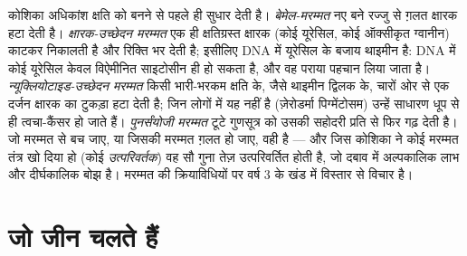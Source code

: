 \begin{proposition}\label{prop:b2:genome-diversification:repair}
कोशिका अधिकांश क्षति को  बनने से पहले ही सुधार देती है।
\emph{बेमेल-मरम्मत} नए बने रज्जु से ग़लत क्षारक हटा देती है।
\emph{क्षारक-उच्छेदन मरम्मत} एक ही क्षतिग्रस्त क्षारक (कोई यूरेसिल, कोई
ऑक्सीकृत ग्वानीन) काटकर निकालती है और रिक्ति भर देती है; इसीलिए DNA में
यूरेसिल के बजाय थाइमीन है: DNA में कोई यूरेसिल केवल विऐमीनित साइटोसीन ही
हो सकता है, और वह पराया पहचान लिया जाता है। \emph{न्यूक्लियोटाइड-उच्छेदन
मरम्मत} किसी भारी-भरकम क्षति के, जैसे थाइमीन द्विलक के, चारों ओर से एक
दर्जन क्षारक का टुकड़ा हटा देती है; जिन लोगों में यह नहीं है
(ज़ेरोडर्मा पिग्मेंटोसम) उन्हें साधारण धूप से ही त्वचा-कैंसर हो जाते
हैं। \emph{पुनर्संयोजी मरम्मत} टूटे गुणसूत्र को उसकी सहोदरी प्रति से
फिर गढ़ देती है। जो मरम्मत से बच जाए, या जिसकी मरम्मत ग़लत हो जाए, वही
 है --- और जिस कोशिका ने कोई मरम्मत तंत्र खो दिया हो (कोई
\emph{उत्परिवर्तक}) वह सौ गुना तेज़ उत्परिवर्तित होती है, जो दबाव में
अल्पकालिक लाभ और दीर्घकालिक बोझ है। मरम्मत की क्रियाविधियों पर वर्ष 3 के
खंड में विस्तार से विचार है।
\end{proposition}

\section{जो जीन चलते हैं}

